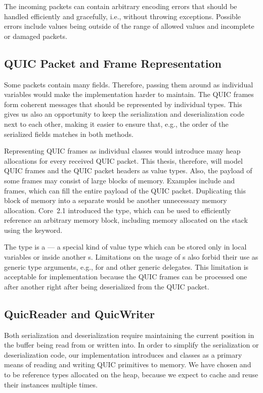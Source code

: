 The incoming packets can contain arbitrary encoding errors that should be handled efficiently and
gracefully, i.e., without throwing exceptions. Possible errors include values being outside of the
range of allowed values and incomplete or damaged packets.

\subsection{QUIC Packet and Frame Representation}\label{sec:03-data-representation}

Some packets contain many fields. Therefore, passing them around as individual variables would make
the implementation harder to maintain. The QUIC frames form coherent messages that should be
represented by individual \dotnet{} types. This gives us also an opportunity to keep the
serialization and deserialization code next to each other, making it easier to ensure that, e.g.,
the order of the serialized fields matches in both methods.

Representing QUIC frames as individual classes would introduce many heap allocations for every
received QUIC packet. This thesis, therefore, will model QUIC frames and the QUIC packet headers as
value types. Also, the payload of some frames may consist of large blocks of memory. Examples
include \STREAM{} and \CRYPTO{} frames, which can fill the entire payload of the QUIC packet.
Duplicating this block of memory into a separate \ArrayOf{\Byte{}} would be another unnecessary
memory allocation. \dotnet{} Core~2.1 introduced the  type, which can be used to
efficiently reference an arbitrary memory block, including memory allocated on the stack using the
 keyword.

The  type is a  --- a special kind of value type which can be
stored only in local variables or inside another s. Limitations on the usage of
s also forbid their use as generic type arguments, e.g., for \FuncOf{} and other
generic delegates. This limitation is acceptable for \QuicConnection{} implementation because the
QUIC frames can be processed one after another right after being deserialized from the QUIC packet.

\subsection{QuicReader and QuicWriter}

Both serialization and deserialization require maintaining the current position in the buffer being
read from or written into. In order to simplify the serialization or deserialization code, our
implementation introduces \QuicReader{} and \QuicWriter{} classes as a primary means of reading and
writing QUIC primitives to memory. We have chosen \QuicReader{} and \QuicWriter{} to be reference
types allocated on the heap, because we expect to cache and reuse their instances multiple times.


